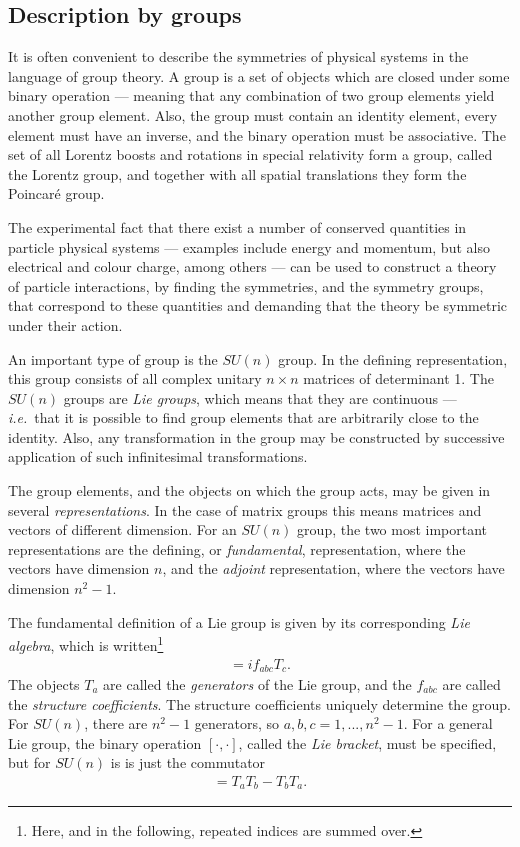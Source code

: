 \documentclass[twoside,english]{uiofysmaster}
\begin{document}
\subsection{Description by groups}
It is often convenient to describe the symmetries of physical systems in the language of group theory. A group is a set of objects which are closed under some binary operation --- meaning that any combination of two group elements yield another group element. Also, the group must contain an identity element, every element must have an inverse, and the binary operation must be associative. The set of all Lorentz boosts and rotations in special relativity form a group, called the Lorentz group, and together with all spatial translations they form the Poincar\'{e} group. 

The experimental fact that there exist a number of conserved quantities in particle physical systems --- examples include energy and momentum, but also electrical and colour charge, among others --- can be used to construct a theory of particle interactions, by finding the symmetries, and the symmetry groups, that correspond to these quantities and demanding that the theory be symmetric under their action.

An important type of group is the $SU(n)$ group. In the defining representation, this group consists of all complex unitary $n\times n$ matrices of determinant 1. The $SU(n)$ groups are {\it Lie groups}, which means that they are continuous --- {\it i.e.}\ that it is possible to find group elements that are arbitrarily close to the identity. Also, any transformation in the group may be constructed by successive application of such infinitesimal transformations. 

The group elements, and the objects on which the group acts, may be given in several {\it representations}. In the case of matrix groups this means matrices and vectors of different dimension. For an $SU(n)$ group, the two most important representations are the defining, or {\it fundamental}, representation, where the vectors have dimension $n$, and the {\it adjoint} representation, where the vectors have dimension $n^2-1$.

The fundamental definition of a Lie group is given by its corresponding {\it Lie algebra}, which is written\footnote{Here, and in the following, repeated indices are summed over.} 
\begin{align}
	[T_a, T_b] = i f_{abc}T_c.
\end{align}
The objects $T_a$ are called the {\it generators} of the Lie group, and the $f_{abc}$ are called the {\it structure coefficients}. The structure coefficients uniquely determine the group. For $SU(n)$, there are $n^2 - 1$ generators, so $a,b,c =1,...,n^2-1$. For a general Lie group, the binary operation $[\cdot , \cdot ]$, called the {\it Lie bracket}, must be specified, but for $SU(n)$ is is just the commutator
\begin{align}
	[T_a, T_b] = T_aT_b - T_bT_a.
\end{align}
\end{document}
